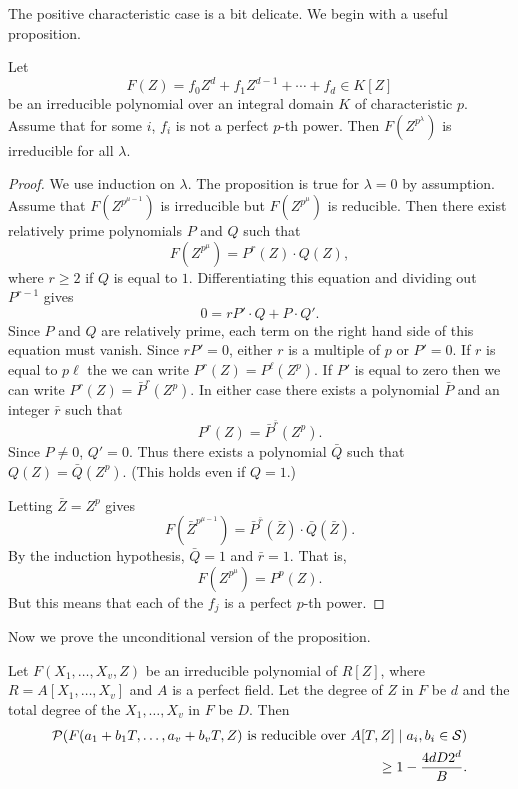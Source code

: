 The positive characteristic case is a bit delicate.  We begin with a
useful proposition.

\begin{proposition}\label{KIT:Lift:Prop}
Let
\[
F(Z) = f_0 Z^d + f_1 Z^{d-1} + \cdots + f_d \in K[Z]
\]
be an irreducible polynomial over an integral domain $K$ of
characteristic $p$.  Assume that for some $i$, $f_i$ is not a perfect
$p$-th power.  Then $F(Z^{p^{\lambda}})$ is irreducible for all
$\lambda$.
\end{proposition}

\begin{proof}
We use induction on $\lambda$.  The proposition is true for $\lambda =
0$ by assumption.  Assume that $F(Z^{p^{\mu-1}})$ is irreducible but
$F(Z^{p^{\mu}})$ is reducible.  Then there exist relatively prime
polynomials $P$ and $Q$ such that
\[
F(Z^{p^{\mu}}) = P^r(Z) \cdot Q(Z),
\]
where $r\ge 2$ if $Q$ is equal to $1$.  Differentiating this equation
and dividing out $P^{r-1}$ gives
\[
0 = r P' \cdot Q + P \cdot Q'.
\]
Since $P$ and $Q$ are relatively prime, each term on the right hand
side of this equation must vanish.  Since $r P' = 0$, either $r$ is a
multiple of $p$ or $P' = 0$.  If $r$ is equal to $p\ell$ the we can
write $P^r(Z) = P^{\ell}(Z^p)$.  If $P'$ is equal to zero then we can
write $P^r(Z) = \bar{P}^r(Z^p)$.  In either case there exists a
polynomial $\bar{P}$ and an integer $\bar{r}$ such that
\[
P^r(Z) = \bar{P}^{\bar{r}}(Z^p).
\]
Since $P \not=0$, $Q' = 0$.  Thus there exists a polynomial $\bar{Q}$
such that $Q(Z) = \bar{Q}(Z^p)$.  (This holds even if $Q = 1$.)

Letting $\bar{Z} = Z^p$ gives
\[
F(\bar{Z}^{p^{\mu-1}}) = \bar{P}^{\bar{r}}(\bar{Z}) \cdot
\bar{Q}(\bar{Z}).
\]
By the induction hypothesis, $\bar{Q} = 1$ and $\bar{r} = 1$.  That
is,
\[
F(Z^{p^{\mu}}) = P^p(Z).
\]
But this means that each of the $f_j$ is a perfect $p$-th power.
\end{proof}

Now we prove the unconditional version of the proposition. 

\begin{proposition}[Kaltofen] \label{KIT:Prop}
Let $F(X_1, \ldots, X_v, Z)$ be an irreducible polynomial of $R[Z]$, where $R =
A[X_1, \ldots, X_v]$ and $A$ is a perfect field.  Let the degree of
$Z$ in $F$ be $d$ and the total degree of the $X_1, \ldots, X_v$ in
$F$ be $D$.  Then
\[
\begin{aligned}
{\cal P}(\mbox{$F(a_1+ b_1T, \ldots, a_v+b_vT, Z)$ is reducible over $A[T, Z]$}
   \mid a_i, b_i \in {\cal S}) \\
 \quad \ge 1 - \frac{4 dD 2^{d}}{B}.
\end{aligned}
\]
\end{proposition}

